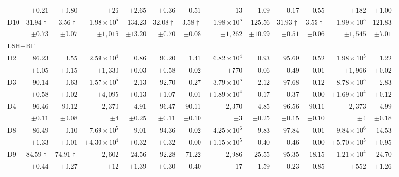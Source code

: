 \begin{table}[t]
{\begin{tabular}{lrrrrrrrrrrrr}
 & $\pm 0.21$ & $\pm 0.80$ & $\pm 26$ & $\pm 2.65$ & $\pm 0.36$ & $\pm 0.51$ & $\pm 13$ & $\pm 1.09$ & $\pm 0.17$ & $\pm 0.55$ & $\pm 182$ & $\pm 1.00$ \\
D10 & $31.94\dagger$ & $3.56\dagger$ & $1.98\times 10^{5}$ & $134.23$ & $32.08\dagger$ & $3.58\dagger$ & $1.98\times 10^{5}$ & $125.56$ & $31.93\dagger$ & $3.55\dagger$ & $1.99\times 10^{5}$ & $121.83$ \\
 & $\pm 0.73$ & $\pm 0.07$ & $\pm 1{,}016$ & $\pm 13.20$ & $\pm 0.70$ & $\pm 0.08$ & $\pm 1{,}262$ & $\pm 10.99$ & $\pm 0.51$ & $\pm 0.06$ & $\pm 1{,}545$ & $\pm 7.01$ \\
\midrule
\multicolumn{13}{l}{\textsc{LSH+BF}} \\
\midrule
D2 & $86.23$ & $3.55$ & $2.59\times 10^{4}$ & $0.86$ & $90.20$ & $1.41$ & $6.82\times 10^{4}$ & $0.93$ & $95.69$ & $0.52$ & $1.98\times 10^{5}$ & $1.22$ \\
 & $\pm 1.05$ & $\pm 0.15$ & $\pm 1{,}330$ & $\pm 0.03$ & $\pm 0.58$ & $\pm 0.02$ & $\pm 770$ & $\pm 0.06$ & $\pm 0.49$ & $\pm 0.01$ & $\pm 1{,}966$ & $\pm 0.02$ \\
D3 & $90.14$ & $0.63$ & $1.57\times 10^{5}$ & $2.13$ & $92.70$ & $0.27$ & $3.79\times 10^{5}$ & $2.12$ & $97.68$ & $0.12$ & $8.78\times 10^{5}$ & $2.83$ \\
 & $\pm 0.58$ & $\pm 0.02$ & $\pm 4{,}095$ & $\pm 0.13$ & $\pm 1.07$ & $\pm 0.01$ & $\pm 1.89\times 10^{4}$ & $\pm 0.17$ & $\pm 0.37$ & $\pm 0.00$ & $\pm 1.69\times 10^{4}$ & $\pm 0.12$ \\
D4 & $96.46$ & $90.12$ & $2{,}370$ & $4.91$ & $96.47$ & $90.11$ & $2{,}370$ & $4.85$ & $96.56$ & $90.11$ & $2{,}373$ & $4.99$ \\
 & $\pm 0.11$ & $\pm 0.08$ & $\pm 4$ & $\pm 0.25$ & $\pm 0.11$ & $\pm 0.10$ & $\pm 3$ & $\pm 0.25$ & $\pm 0.15$ & $\pm 0.10$ & $\pm 4$ & $\pm 0.18$ \\
D8 & $86.49$ & $0.10$ & $7.69\times 10^{5}$ & $9.01$ & $94.36$ & $0.02$ & $4.25\times 10^{6}$ & $9.83$ & $97.84$ & $0.01$ & $9.84\times 10^{6}$ & $14.53$ \\
 & $\pm 1.33$ & $\pm 0.01$ & $\pm 4.30\times 10^{4}$ & $\pm 0.32$ & $\pm 0.32$ & $\pm 0.00$ & $\pm 1.15\times 10^{5}$ & $\pm 0.40$ & $\pm 0.46$ & $\pm 0.00$ & $\pm 5.70\times 10^{5}$ & $\pm 0.95$ \\
D9 & $84.59\dagger$ & $74.91\dagger$ & $2{,}602$ & $24.56$ & $92.28$ & $71.22$ & $2{,}986$ & $25.55$ & $95.35$ & $18.15$ & $1.21\times 10^{4}$ & $24.70$ \\
 & $\pm 0.44$ & $\pm 0.27$ & $\pm 12$ & $\pm 1.39$ & $\pm 0.30$ & $\pm 0.40$ & $\pm 17$ & $\pm 1.59$ & $\pm 0.23$ & $\pm 0.85$ & $\pm 552$ & $\pm 1.26$ \\

\end{tabular}}
\end{table}
